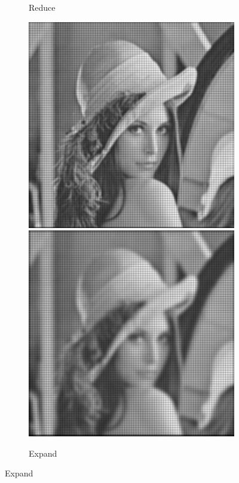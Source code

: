 \begin{figure}
\begin{subfigure}{.49\textwidth}
		\caption{Reduce}
	\end{subfigure}
	\begin{subfigure}{.49\textwidth}
		\centering
		\includegraphics[width=.99\linewidth]{A6/expand1.jpg}
		\includegraphics[width=.99\linewidth]{A6/expand2.jpg}
		\caption{Expand}
	\end{subfigure}
\end{figure}
